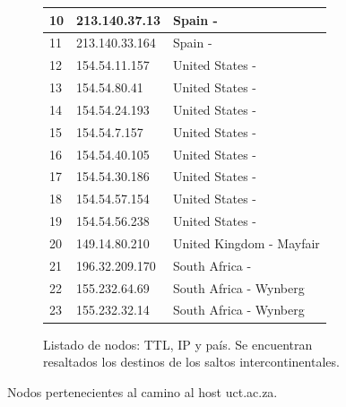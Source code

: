\begin{figure}[ht]
\begin{subfigure}[b]{.39\textwidth}
\begin{tabular}{ l l l }
      10 & 213.140.37.13 & Spain - \\ \hline
      11 & 213.140.33.164 & Spain - \\ \hline
      \rowcolor[RGB]{196,214,255}
      12 & 154.54.11.157 & United States - \\ \hline
      13 & 154.54.80.41 & United States - \\ \hline
      14 & 154.54.24.193 & United States - \\ \hline
      15 & 154.54.7.157 & United States - \\ \hline
      16 & 154.54.40.105 & United States - \\ \hline
      \rowcolor[RGB]{196,214,255}
      17 & 154.54.30.186 & United States - \\ \hline
      18 & 154.54.57.154 & United States - \\ \hline
      19 & 154.54.56.238 & United States - \\ \hline
      20 & 149.14.80.210 & United Kingdom - Mayfair\\ \hline
      \rowcolor[RGB]{196,214,255}
      21 & 196.32.209.170 & South Africa - \\ \hline
      22 & 155.232.64.69 & South Africa - Wynberg\\ \hline
      23 & 155.232.32.14 & South Africa - Wynberg\\ \hline
      \hline
    \end{tabular}
    \label{fig:capetown_list}
    \caption{Listado de nodos: TTL, IP y país. Se encuentran resaltados los destinos de los saltos intercontinentales.}
  \end{subfigure}
  \caption{Nodos pertenecientes al camino al host uct.ac.za.}
\end{figure}

